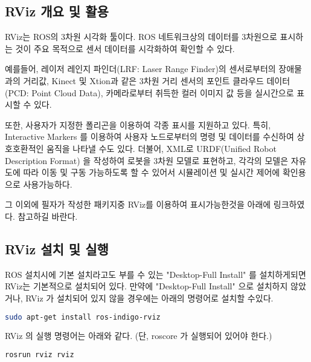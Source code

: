 \subsection{RViz 개요 및 활용}

RViz는 ROS의 3차원 시각화 툴이다. ROS 네트워크상의 데이터를 3차원으로 표시하는 것이 주요 목적으로 센서 데이터를 시각화하여 확인할 수 있다. 

예를들어, 레이저 레인지 파인더(LRF: Laser Range Finder)의 센서로부터의 장애물과의 거리값, Kinect 및 Xtion과 같은 3차원 거리 센서의 포인트 클라우드 데이터 (PCD: Point Cloud Data), 카메라로부터 취득한 컬러 이미지 값 등을 실시간으로 표시할 수 있다. 

또한, 사용자가 지정한 폴리곤을 이용하여 각종 표시를 지원하고 있다. 특히, Interactive Markers 를 이용하여 사용자 노드로부터의 명령 및 데이터를 수신하여 상호호환적인 움직을 나타낼 수도 있다. 더불어, XML로 URDF(Unified Robot Description Format) 을 작성하여 로봇을 3차원 모델로 표현하고, 각각의 모델은 자유도에 따라 이동 및 구동 가능하도록 할 수 있어서 시뮬레이션 및 실시간 제어에 확인용으로 사용가능하다.

그 이외에 필자가 작성한 패키지중 RViz를 이용하여 표시가능한것을 아래에 링크하였다. 참고하길 바란다.

\subsection{RViz 설치 및 실행}

ROS 설치시에 기본 설치라고도 부를 수 있는 "Desktop-Full Install" 를 설치하게되면 RViz는 기본적으로 설치되어 있다. 만약에 "Desktop-Full Install" 으로 설치하지 않았거나, RViz 가 설치되어 있지 않을 경우에는 아래의 명령어로 설치할 수있다.

\begin{lstlisting}[language=bash]
sudo apt-get install ros-indigo-rviz
\end{lstlisting}

\noindent
RViz 의 실행 명령어는 아래와 같다. (단, roscore 가 실행되어 있어야 한다.)

\begin{lstlisting}[language=bash]
rosrun rviz rviz
\end{lstlisting}

